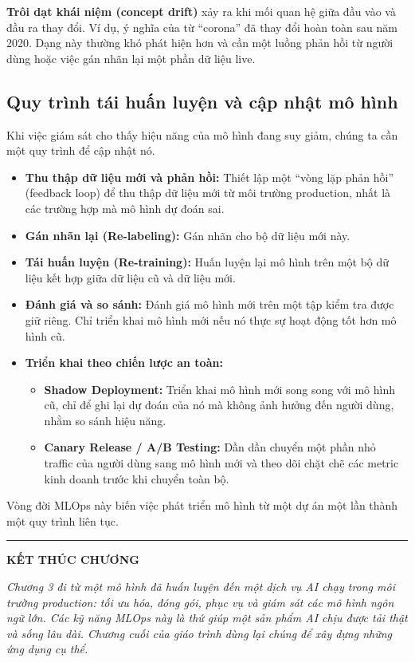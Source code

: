 \textbf{Trôi dạt khái niệm (concept drift)} xảy ra khi mối quan hệ giữa đầu vào và đầu ra thay đổi. Ví dụ, ý nghĩa của từ “corona” đã thay đổi hoàn toàn sau năm 2020. Dạng này thường khó phát hiện hơn và cần một luồng phản hồi từ người dùng hoặc việc gán nhãn lại một phần dữ liệu live.

\subsection{Quy trình tái huấn luyện và cập nhật mô hình}
\label{ssec:retraining_pipeline}
Khi việc giám sát cho thấy hiệu năng của mô hình đang suy giảm, chúng ta cần một quy trình để cập nhật nó.
\begin{itemize}
    \item \textbf{Thu thập dữ liệu mới và phản hồi:} Thiết lập một “vòng lặp phản hồi” (feedback loop) để thu thập dữ liệu mới từ môi trường production, nhất là các trường hợp mà mô hình dự đoán sai.
    \item \textbf{Gán nhãn lại (Re-labeling):} Gán nhãn cho bộ dữ liệu mới này.
    \item \textbf{Tái huấn luyện (Re-training):} Huấn luyện lại mô hình trên một bộ dữ liệu kết hợp giữa dữ liệu cũ và dữ liệu mới.
    \item \textbf{Đánh giá và so sánh:} Đánh giá mô hình mới trên một tập kiểm tra được giữ riêng. Chỉ triển khai mô hình mới nếu nó thực sự hoạt động tốt hơn mô hình cũ.
    \item \textbf{Triển khai theo chiến lược an toàn:}
        \begin{itemize}
            \item \textbf{Shadow Deployment:} Triển khai mô hình mới song song với mô hình cũ, chỉ để ghi lại dự đoán của nó mà không ảnh hưởng đến người dùng, nhằm so sánh hiệu năng.
            \item \textbf{Canary Release / A/B Testing:} Dần dần chuyển một phần nhỏ traffic của người dùng sang mô hình mới và theo dõi chặt chẽ các metric kinh doanh trước khi chuyển toàn bộ.
        \end{itemize}
\end{itemize}
Vòng đời MLOps này biến việc phát triển mô hình từ một dự án một lần thành một quy trình liên tục.

\bigskip
\hrule
\bigskip

\begin{center}
    \textbf{\Large KẾT THÚC CHƯƠNG \thechapter}
\end{center}
\textit{Chương 3 đi từ một mô hình đã huấn luyện đến một dịch vụ AI chạy trong môi trường production: tối ưu hóa, đóng gói, phục vụ và giám sát các mô hình ngôn ngữ lớn. Các kỹ năng MLOps này là thứ giúp một sản phẩm AI chịu được tải thật và sống lâu dài. Chương cuối của giáo trình dùng lại chúng để xây dựng những ứng dụng cụ thể.}